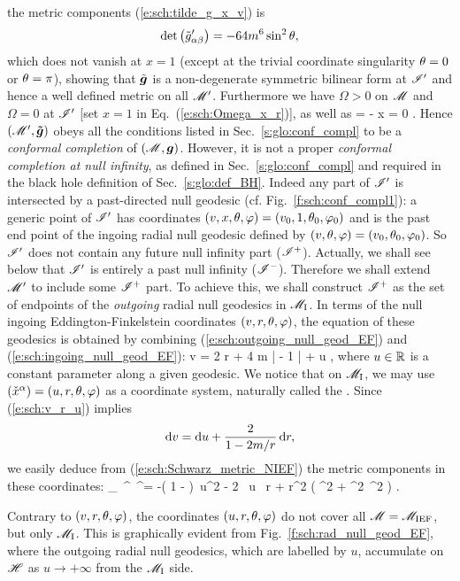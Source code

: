 the metric components (\ref{e:sch:tilde_g_x_v}) is
\[
    \det\left({\tilde{g}'}_{\alpha\beta}\right) = - 64 m^6 \sin^2\theta ,
\]
which does not vanish at $x=1$ (except at the trivial coordinate singularity
$\theta=0$ or $\theta=\pi$), showing that $\tilde{\bm{g}}$ is a non-degenerate
symmetric bilinear form at $\mathscr{I}'$ and hence a well defined metric on all
$\mathscr{M}'$.
Furthermore
we have $\Omega >0$ on $\mathscr{M}$ and $\Omega=0$ at $\mathscr{I}'$ [set $x=1$ in Eq.~(\ref{e:sch:Omega_x_r})], as well as
\be
    \dd \Omega = - \dd x \not = 0 .
\ee
Hence $(\mathscr{M}',\bm{\tilde{g}})$ obeys all the conditions
listed in Sec.~\ref{s:glo:conf_compl} to be a \emph{conformal completion}
of $(\mathscr{M},\bm{g})$.
However, it is not a proper \emph{conformal completion at null infinity},
as defined in Sec.~\ref{s:glo:conf_compl} and required in the black hole
definition of Sec.~\ref{s:glo:def_BH}. Indeed any part of $\mathscr{I}'$ is intersected by
a past-directed null geodesic (cf. Fig.~\ref{f:sch:conf_compl1}): a generic point of $\mathscr{I}'$ has coordinates
$(v,x,\theta,\varphi) = (v_0,1,\theta_0,\varphi_0)$ and is the past end point of the
ingoing radial null geodesic defined by
$(v,\theta,\varphi) = (v_0,\theta_0,\varphi_0)$.
So $\mathscr{I}'$ does not contain any future null infinity part ($\mathscr{I}^+$). Actually,
we shall see below that $\mathscr{I}'$ is entirely a past null infinity ($\mathscr{I}^-$).
Therefore we shall extend $\mathscr{M}'$ to include some $\mathscr{I}^+$ part.
To achieve this, we shall construct $\mathscr{I}^+$ as the set of endpoints of the
\emph{outgoing} radial null geodesics in $\mathscr{M}_{\rm I}$. In terms of
the null ingoing Eddington-Finkelstein coordinates $(v,r,\theta,\varphi)$,
the equation of these geodesics is obtained by combining (\ref{e:sch:outgoing_null_geod_EF}) and (\ref{e:sch:ingoing_null_geod_EF}):
\be \label{e:sch:v_r_u}
    v = 2 r + 4 m \ln \left|  - 1 \right| + u ,
\ee
where $u\in\mathbb{R}$ is a constant parameter along a given geodesic.
We notice that on $\mathscr{M}_{\rm I}$, we may use $(\check{x}^\alpha) = (u,r,\theta,\varphi)$ as a coordinate
system, naturally called the . Since (\ref{e:sch:v_r_u}) implies
\[
    \mathrm{d} v = \mathrm{d} u + \frac{2}{1-2m/r}\, \mathrm{d} r,
\]
we easily deduce from (\ref{e:sch:Schwarz_metric_NIEF}) the metric components
in these coordinates:
\be \label{e:sch:g_u_r}
        {}_{\mu\nu}\, ^\mu \, ^\nu =
            -\left( 1 -  \right)\, \D u^2
            - 2 \, \D u \, \D r
        + r^2 \left( \D\th^2 + \sin^2\th\, \D\ph^2 \right) .
\ee
\begin{remark}
Contrary to $(v,r,\theta,\varphi)$, the coordinates $(u,r,\theta,\varphi)$ do not cover
all $\mathscr{M} = \mathscr{M}_{\rm IEF}$, but only $\mathscr{M}_{\rm I}$. This is graphically
evident from
Fig.~\ref{f:sch:rad_null_geod_EF}, where the outgoing radial null geodesics,
which are labelled by $u$, accumulate on $\mathscr{H}$ as $u\rightarrow +\infty$
from the $\mathscr{M}_{\rm I}$ side.
\end{remark}

